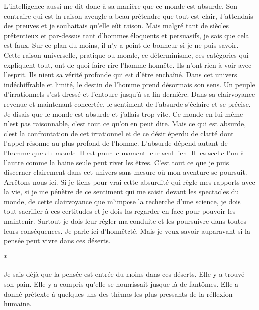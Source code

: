 \documentclass{book}
\begin{document}
L'intelligence aussi me dit donc à sa manière que ce monde est absurde. Son contraire qui est la raison aveugle a beau prétendre que tout est clair, J'attendais des preuves et je souhaitais qu'elle eût raison. Mais malgré tant de siècles prétentieux et par‑dessus tant d'hommes éloquents et persuasifs, je sais que cela est faux. Sur ce plan du moins, il n'y a point de bonheur si je ne puis savoir. Cette raison universelle, pratique ou morale, ce déterminisme, ces catégories qui expliquent tout, ont de quoi faire rire l'homme honnête. Ils n'ont rien à voir avec l'esprit. Ils nient sa vérité profonde qui est d'être enchaîné. Dans cet univers indéchiffrable et limité, le destin de l'homme prend désormais son sens. Un peuple d'irrationnels s'est dressé et l'entoure jusqu'à sa fin dernière. Dans sa clairvoyance revenue et maintenant concertée, le sentiment de l'absurde s'éclaire et se précise. Je disais que le monde est absurde et j'allais trop vite. Ce monde en lui‑même n'est pas raisonnable, c'est tout ce qu'on en peut dire. Mais ce qui est absurde, c'est la confrontation de cet irrationnel et de ce désir éperdu de clarté dont l'appel résonne au plus profond de l'homme. L'absurde dépend autant de l'homme que du monde. Il est pour le moment leur seul lien. Il les scelle l'un à l'autre comme la haine seule peut river les êtres. C'est tout ce que je puis discerner clairement dans cet univers sans mesure où mon aventure se poursuit. Arrêtons-nous ici. Si je tiens pour vrai cette absurdité qui règle mes rapports avec la vie, si je me pénètre de ce sentiment qui me saisit devant les spectacles du monde, de cette clairvoyance que m'impose la recherche d'une science, je dois tout sacrifier à ces certitudes et je dois les regarder en face pour pouvoir les maintenir. Surtout je dois leur régler ma conduite et les poursuivre dans toutes leurs conséquences. Je parle ici d'honnêteté. Mais je veux savoir auparavant si la pensée peut vivre dans ces déserts.

\begin{center}
*
\end{center}

Je sais déjà que la pensée est entrée du moins dans ces déserts. Elle y a trouvé son pain. Elle y a compris qu'elle se nourrissait jusque‑là de fantômes. Elle a donné prétexte à quelques-uns des thèmes les plus pressants de la réflexion humaine.
\end{document}
